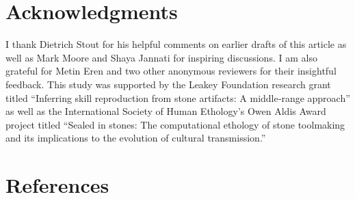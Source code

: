\documentclass[
  11pt,
  letterpaper,
  DIV=11,
  numbers=noendperiod]{scrartcl}
\begin{document}
\section{Acknowledgments}\label{acknowledgments}

I thank Dietrich Stout for his helpful comments on earlier drafts of
this article as well as Mark Moore and Shaya Jannati for inspiring
discussions. I am also grateful for Metin Eren and two other anonymous
reviewers for their insightful feedback. This study was supported by the
Leakey Foundation research grant titled ``Inferring skill reproduction
from stone artifacts: A middle‐range approach'' as well as the
International Society of Human Ethology's Owen Aldis Award project
titled ``Sealed in stones: The computational ethology of stone
toolmaking and its implications to the evolution of cultural
transmission.''

\section*{References}\label{references}
\end{document}
